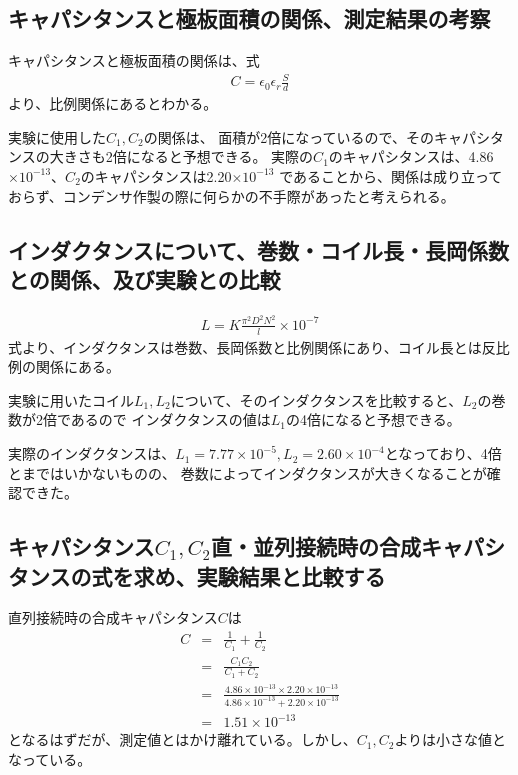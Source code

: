 \documentclass[dvipdfmx]{jsarticle}
\begin{document}
\subsection{キャパシタンスと極板面積の関係、測定結果の考察}
キャパシタンスと極板面積の関係は、式
\begin{eqnarray*}
  C = \epsilon_0 \epsilon_r \frac{S}{d}
\end{eqnarray*}
より、比例関係にあるとわかる。

実験に使用した$C_1, C_2$の関係は、
面積が2倍になっているので、そのキャパシタンスの大きさも2倍になると予想できる。
実際の$C_1$のキャパシタンスは、4.86$\times 10^{-13}$、$C_2$のキャパシタンスは2.20$\times 10^{-13}$
であることから、関係は成り立っておらず、コンデンサ作製の際に何らかの不手際があったと考えられる。

\subsection{インダクタンスについて、巻数・コイル長・長岡係数との関係、及び実験との比較}
\begin{eqnarray*}
  L = K \frac{\pi^2 D^2 N^2}{l} \times 10^{-7}
\end{eqnarray*}
式より、インダクタンスは巻数、長岡係数と比例関係にあり、コイル長とは反比例の関係にある。

実験に用いたコイル$L_1, L_2$について、そのインダクタンスを比較すると、$L_2$の巻数が2倍であるので
インダクタンスの値は$L_1$の4倍になると予想できる。

実際のインダクタンスは、$L_1 = 7.77\times 10^{-5}, L_2 = 2.60 \times 10^{-4}$となっており、4倍とまではいかないものの、
巻数によってインダクタンスが大きくなることが確認できた。

\subsection{キャパシタンス$C_1, C_2$直・並列接続時の合成キャパシタンスの式を求め、実験結果と比較する}
直列接続時の合成キャパシタンス$C$は
\begin{eqnarray*}
  C & = &\frac{1}{C_1} + \frac{1}{C_2}\\
  & = &\frac{C_1 C_2}{C_1 + C_2}\\
  & = &\frac{4.86 \times 10^{-13} \times 2.20 \times 10^{-13} }{4.86 \times 10^{-13} + 2.20 \times 10^{-13} }\\
  & = &1.51 \times 10^{-13}
\end{eqnarray*}
となるはずだが、測定値とはかけ離れている。しかし、$C_1, C_2$よりは小さな値となっている。
\end{document}
